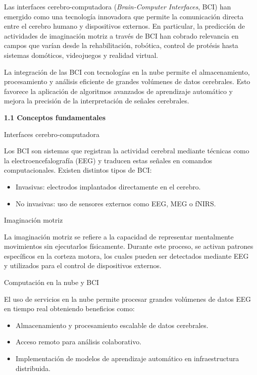 \documentclass[
11pt, %
]{charter}
\begin{document}
Las interfaces cerebro-computadora (\textit{Brain-Computer Interfaces}, BCI) han emergido como una tecnología innovadora que permite la comunicación directa entre el cerebro humano y dispositivos externos.
En particular, la predicción de actividades de imaginación motriz a través de BCI han cobrado relevancia en campos que varían desde la rehabilitación, robótica, control de protésis hasta sistemas domóticos, videojuegos y realidad virtual.

La integración de las BCI con tecnologías en la nube permite el almacenamiento, procesamiento y análisis eficiente de grandes volúmenes de datos cerebrales. Esto favorece la aplicación de algoritmos avanzados de aprendizaje automático y mejora la precisión de la interpretación de señales cerebrales.

\textbf{1.1 Conceptos fundamentales}

Interfaces cerebro-computadora

Los BCI son sistemas que registran la actividad cerebral mediante técnicas como la electroencefalografía (EEG) y traducen estas señales en comandos computacionales. Existen distintos tipos de BCI:
\begin{itemize}
	\item Invasivas: electrodos implantados directamente en el cerebro.
	\item No invasivas: uso de sensores externos como EEG, MEG o fNIRS.
\end{itemize}

Imaginación motriz

La imaginación motriz se refiere a la capacidad de representar mentalmente movimientos sin ejecutarlos físicamente. Durante este proceso, se activan patrones específicos en la corteza motora, los cuales pueden ser detectados mediante EEG y utilizados para el control de dispositivos externos.

Computación en la nube y BCI

El uso de servicios en la nube permite procesar grandes volúmenes de datos EEG en tiempo real obteniendo beneficios como:
\begin{itemize}
	\item Almacenamiento y procesamiento escalable de datos cerebrales.
	\item Acceso remoto para análisis colaborativo.
	\item Implementación de modelos de aprendizaje automático en infraestructura distribuida.
\end{itemize}
\end{document}
